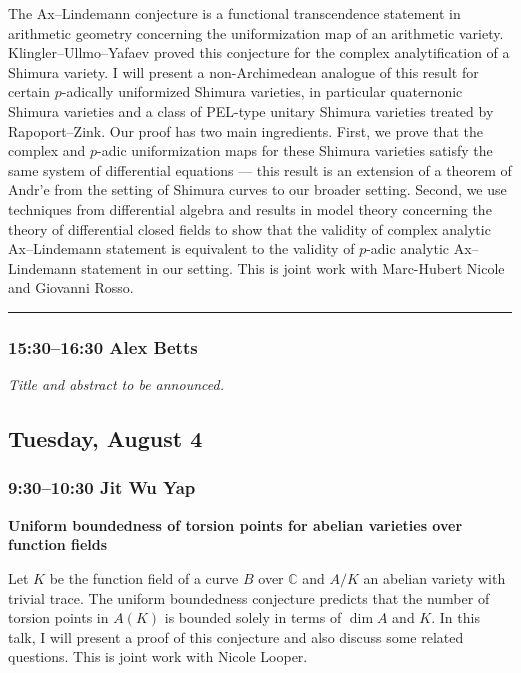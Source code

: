 \documentclass[11pt]{amsart}
\numberwithin{equation}{section}
\begin{document}
The Ax--Lindemann conjecture is a functional transcendence statement in arithmetic geometry concerning the uniformization map of an arithmetic variety. Klingler--Ullmo--Yafaev proved this conjecture for the complex analytification of a Shimura variety. I will present a non-Archimedean analogue of this result for certain $p$-adically uniformized Shimura varieties, in particular quaternonic Shimura varieties and a class of PEL-type unitary Shimura varieties treated by Rapoport--Zink. Our proof has two main ingredients. First, we prove that the complex and $p$-adic uniformization maps for these Shimura varieties satisfy the same system of differential equations --- this result is an extension of a theorem of Andr'e from the setting of Shimura curves to our broader setting. Second, we use techniques from differential algebra and results in model theory concerning the theory of differential closed fields to show that the validity of complex analytic Ax--Lindemann statement is equivalent to the validity of $p$-adic analytic Ax--Lindemann statement in our setting. This is joint work with Marc-Hubert Nicole and Giovanni Rosso.

\bigskip
\hrule
\bigskip

\subsubsection*{15:30--16:30 \quad Alex Betts}

\emph{Title and abstract to be announced.}

\newpage

\subsection*{Tuesday, August 4}

\subsubsection*{9:30--10:30 \quad Jit Wu Yap}

\textbf{Uniform boundedness of torsion points for abelian varieties over function fields}

Let $K$ be the function field of a curve $B$ over $\mathbb{C}$ and $A/K$ an abelian variety with trivial trace. The uniform boundedness conjecture predicts that the number of torsion points in $A(K)$ is bounded solely in terms of $\dim A$ and $K$. In this talk, I will present a proof of this conjecture and also discuss some related questions. This is joint work with Nicole Looper.
\end{document}
